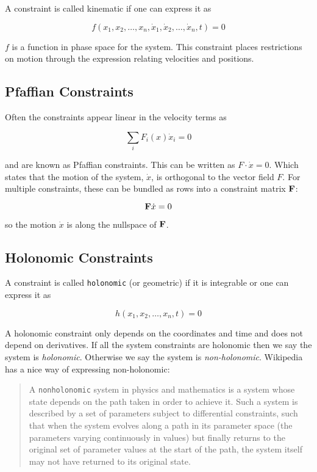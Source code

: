 A constraint is called kinematic if one can express it as

\[f(x_1, x_2, \dots, x_n, \dot{x}_1, \dot{x}_2, \dots , \dot{x}_n, t)=0\]

\(f\) is a function in phase space for the system. This constraint
places restrictions on motion through the expression relating velocities
and positions.

\hypertarget{pfaffian-constraints}{%
\subsection{Pfaffian Constraints}\label{pfaffian-constraints}}

Often the constraints appear linear in the velocity terms as

\[\sum_i F_i(x) \dot{x}_i = 0\]

and are known as Pfaffian constraints. This can be written as
\(F \cdot \dot{x} = 0\). Which states that the motion of the system,
\(\dot{x}\), is orthogonal to the vector field \(F\). For multiple
constraints, these can be bundled as rows into a constraint matrix
\(\bf{F}\):

\[{\bf F} \dot{x} = 0\]

so the motion \(\dot{x}\) is along the nullspace of \(\bf F\).

\hypertarget{holonomic-constraints}{%
\subsection{Holonomic Constraints}\label{holonomic-constraints}}

A constraint is called \texttt{holonomic} (or geometric) if it is
integrable or one can express it as

\[h(x_1, x_2, \dots , x_n, t)=0\]

A holonomic constraint only depends on the coordinates and time and does
not depend on derivatives. If all the system constraints are holonomic
then we say the system is \emph{holonomic}. Otherwise we say the system
is \emph{non-holonomic}. Wikipedia has a nice way of expressing
non-holonomic:

\begin{quote}
A \texttt{nonholonomic} system in physics and mathematics is a system
whose state depends on the path taken in order to achieve it. Such a
system is described by a set of parameters subject to differential
constraints, such that when the system evolves along a path in its
parameter space (the parameters varying continuously in values) but
finally returns to the original set of parameter values at the start of
the path, the system itself may not have returned to its original state.
\end{quote}

